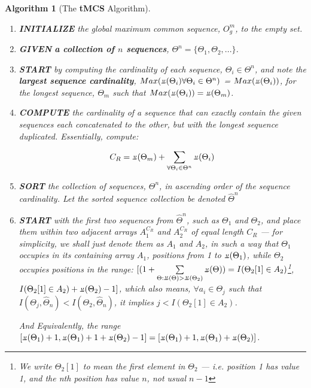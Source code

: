 \documentclass[a4paper, 18pt]{book} %
\newtheorem{alg}{Algorithm}
\newcommand{\invpi}{\rotatebox[origin=c]{180}{$\pi$}}
\begin{document}
\begin{alg}[The \textbf{tMCS} Algorithm]
\label{ALGtMCS}
\begin{enumerate}
\item{\textbf{INITIALIZE} the global maximum common sequence, $O^m_g$, to the empty set.} 
\item{
\textbf{GIVEN}  \textbf{a collection of $n$ sequences}, $\Theta^n = \{\Theta_1, \Theta_2,...\}$.
}
\item{
\textbf{START}  by computing the cardinality of each sequence, $\Theta_i \in \Theta^n$, and note the \textbf{largest sequence cardinality}, $Max(\invpi(\Theta_i) \forall \Theta_i \in \Theta^n)$ = $Max(\invpi(\Theta_i))$, for the longest sequence, $\Theta_m$ such that $Max(\invpi(\Theta_i)) = \invpi(\Theta_m)$.
}
\item {
\textbf{COMPUTE}  the cardinality of a sequence that can exactly contain the given sequences each concatenated to the other, but with the longest sequence duplicated. Essentially, compute:

\begin{equation}
\label{EQLSEQ}
C_R = \invpi(\Theta_m) + \sum\limits_{\forall \Theta_i \in \Theta^n} \invpi(\Theta_i)
\end{equation}

}
\item{
\textbf{SORT}  the collection of sequences, $\Theta^n$, in ascending order of the sequence cardinality. Let the sorted sequence collection be denoted ${\hat{\Theta}}^n$
}
\item {
\textbf{START}  with the first two sequences from ${\hat{\Theta}}^n$, such as $\Theta_1$ and $\Theta_2$, and place them within two adjacent arrays $A_1^{C_R}$ and $A_2^{C_R}$ of equal length $C_R$ --- for simplicity, we shall just denote them as  $A_1$ and $A_2$, in such a way that $\Theta_1$ occupies in its containing array $A_1$, positions from 1 to $\invpi(\Theta_1)$, while $\Theta_2$ occupies positions in the range: $[(1 + \sum \limits_{\Theta: \invpi(\Theta) > \invpi(\Theta_2)}\invpi(\Theta)) = I(\Theta_2[1] \in A_2)$\footnote{We write $\Theta_2[1]$ to mean the first element in $\Theta_2$ --- i.e. position 1 has value 1, and the nth position has value $n$, not usual $n-1$}, $I(\Theta_2[1] \in A_2) + \invpi(\Theta_2) - 1]$, which also means, $\forall a_i \in \Theta_j$ such that $I(\Theta_j,\hat{\Theta}_n) <  I(\Theta_2, \hat{\Theta}_n)$, it implies $j < I(\Theta_2[1] \in A_2)$.

And Equivalently, the range $[\invpi(\Theta_1)+1, \invpi(\Theta_1) + 1 + \invpi(\Theta_2) - 1] = [\invpi(\Theta_1)+1, \invpi(\Theta_1)+ \invpi(\Theta_2)]$. 

}
\end{enumerate}
\end{alg}
\end{document}
